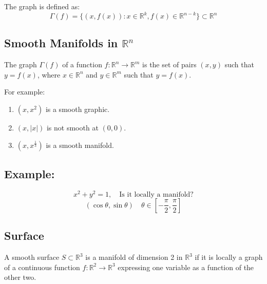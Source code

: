 \documentclass[11pt]{article}
\begin{document}
The graph is defined as:
\[
\Gamma(f) = \{(x,f(x)) : x \in \mathbb{R}^k, f(x) \in \mathbb{R}^{n-k}\} \subset \mathbb{R}^n
\]

\begin{figure}[H]
    \centering
\end{figure}


\subsection{Smooth Manifolds in $\mathbb{R}^n$}
The graph $\Gamma(f)$ of a function $f : \mathbb{R}^n \rightarrow \mathbb{R}^m$ is the set of pairs $(x,y)$ such that $y = f(x)$, where $x \in \mathbb{R}^n$ and $y \in \mathbb{R}^m$ such that $y = f(x)$.

For example:
\begin{enumerate}[label=(\Alph*)]
    \item $(x,x^2)$ is a smooth graphic.
    \item $(x, |x|)$ is not smooth at $(0,0)$.
    \item $(x,x^{\frac{1}{3}})$ is a smooth manifold.
\end{enumerate}

\subsection*{Example:}
\[
x^2 + y^2 = 1, \quad \text{Is it locally a manifold?}
\]
\[
(\cos \theta, \sin \theta) \quad \theta \in [-\frac{\pi}{2}, \frac{\pi}{2}]
\]

\subsection{Surface} 
A smooth surface $S \subset \mathbb{R}^3$ is a manifold of dimension 2 in $\mathbb{R}^3$ if it is locally a graph of a continuous function $f : \mathbb{R}^2 \rightarrow \mathbb{R}^3$ expressing one variable as a function of the other two.
\end{document}
